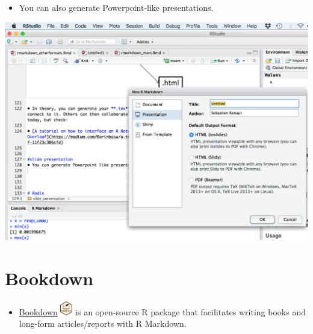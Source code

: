\documentclass[]{article}
\providecommand{\tightlist}{%
  \setlength{\itemsep}{0pt}\setlength{\parskip}{0pt}}
\begin{document}
\begin{itemize}
\tightlist
\item
  You can also generate Powerpoint-like presentations.
\end{itemize}

\includegraphics[width=6.25in,height=\textheight]{../figures/slides.png}

\hypertarget{bookdown}{%
\section{Bookdown}\label{bookdown}}

\begin{itemize}
\tightlist
\item
  \href{https://bookdown.org/}{Bookdown}
  \includegraphics[width=0.20833in,height=\textheight]{../figures/bookdown.png}
  is an open-source R package that facilitates writing books and
  long-form articles/reports with R Markdown.
\end{itemize}
\end{document}
